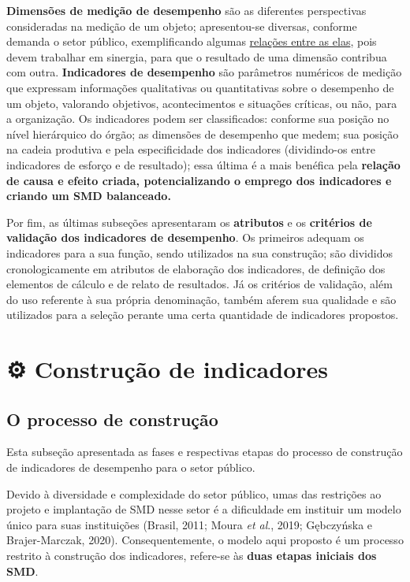 \documentclass[
  letterpaper,
  DIV=11,
  numbers=noendperiod]{scrreprt}
\begin{document}
\textbf{Dimensões de medição de desempenho} são as diferentes
perspectivas consideradas na medição de um objeto; apresentou-se
diversas, conforme demanda o setor público, exemplificando algumas
\href{/o/AZWDclIWFqqJuBEvyQWk/s/ws6bIBOPv2tLRHdwbB7y/2.-fundamentos-teoricos/2.2-dimensoes-de-medicao-de-desempenho-no-setor-publico\#ambientes-algumas-relacoes-entre-as-dimensoes-de-medicao-de-desempenho}{relações
entre as elas}, pois devem trabalhar em sinergia, para que o resultado
de uma dimensão contribua com outra. \textbf{Indicadores de desempenho}
são parâmetros numéricos de medição que expressam informações
qualitativas ou quantitativas sobre o desempenho de um objeto, valorando
objetivos, acontecimentos e situações críticas, ou não, para a
organização. Os indicadores podem ser classificados: conforme sua
posição no nível hierárquico do órgão; as dimensões de desempenho que
medem; sua posição na cadeia produtiva e pela especificidade dos
indicadores (dividindo-os entre indicadores de esforço e de resultado);
essa última é a mais benéfica pela \textbf{relação de causa e efeito
criada, potencializando o emprego dos indicadores e criando um SMD
balanceado.}

Por fim, as últimas subseções apresentaram os \textbf{atributos} e os
\textbf{critérios de validação dos indicadores de desempenho}. Os
primeiros adequam os indicadores para a sua função, sendo utilizados na
sua construção; são divididos cronologicamente em atributos de
elaboração dos indicadores, de definição dos elementos de cálculo e de
relato de resultados. Já os critérios de validação, além do uso
referente à sua própria denominação, também aferem sua qualidade e são
utilizados para a seleção perante uma certa quantidade de indicadores
propostos.

\part{⚙️ Construção de indicadores}

\hypertarget{o-processo-de-construuxe7uxe3o}{%
\chapter{O processo de
construção}\label{o-processo-de-construuxe7uxe3o}}

{Esta subseção apresentada as fases e respectivas etapas do processo de
construção de indicadores de desempenho para o setor público.}

Devido à diversidade e complexidade do setor público, umas das
restrições ao projeto e implantação de SMD nesse setor é a dificuldade
em instituir um modelo único para suas instituições (Brasil, 2011; Moura
\emph{et al}., 2019; Gębczyńska e Brajer-Marczak, 2020).
Consequentemente, o modelo aqui proposto é um processo restrito à
construção dos indicadores, refere-se às \textbf{duas etapas iniciais
dos SMD}.
\end{document}

